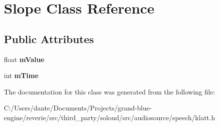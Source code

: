 \hypertarget{class_slope}{}\section{Slope Class Reference}
\label{class_slope}
\subsection*{Public Attributes}
\begin{DoxyCompactItemize}
\item 
\mbox{\label{class_slope_a54a211599183abce3947e5db6034bf2f}} 
float {\bfseries m\+Value}
\item 
\mbox{\label{class_slope_a518766cbbcf8d2a2fedf4fca5e8eac28}} 
int {\bfseries m\+Time}
\end{DoxyCompactItemize}


The documentation for this class was generated from the following file\+:\begin{DoxyCompactItemize}
\item 
C\+:/\+Users/dante/\+Documents/\+Projects/grand-\/blue-\/engine/reverie/src/third\+\_\+party/soloud/src/audiosource/speech/klatt.\+h\end{DoxyCompactItemize}
